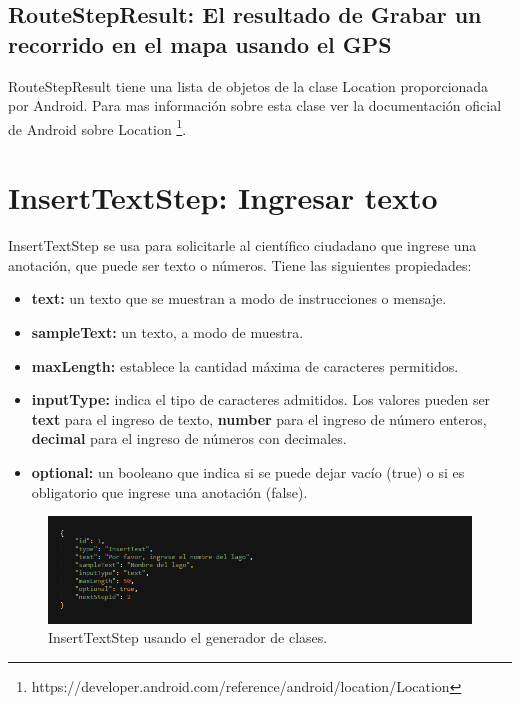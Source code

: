 \subsection{RouteStepResult: El resultado de Grabar un recorrido en el mapa usando el GPS}
RouteStepResult tiene una lista de objetos de la clase Location proporcionada por Android.  Para
mas información sobre esta clase ver la documentación oficial de Android sobre Location \footnote{https://developer.android.com/reference/android/location/Location}.






\section{InsertTextStep: Ingresar texto}
InsertTextStep se usa para solicitarle al científico ciudadano que ingrese una anotación, que puede ser texto o números. Tiene las siguientes propiedades:

\begin{itemize}
\item \textbf{text:} un texto que se muestran a modo de instrucciones o mensaje.
\item \textbf{sampleText:} un texto, a modo de muestra.
\item \textbf{maxLength:} establece la cantidad máxima de caracteres permitidos.
\item \textbf{inputType:} indica el tipo de caracteres admitidos. Los valores pueden ser \textbf{text} para el ingreso de texto, \textbf{number} para el ingreso de número enteros, \textbf{decimal} para el ingreso de números con decimales.
\item \textbf{optional:} un booleano que indica si se puede dejar vacío (true) o si es obligatorio que ingrese una anotación (false).
\end{itemize}

\begin{figure}[H]
  \centering
    \includegraphics[scale=0.6]{50-anexos/C-steps/insert_text_json.png} 
    \caption{InsertTextStep usando el generador de clases.}
\end{figure}	

